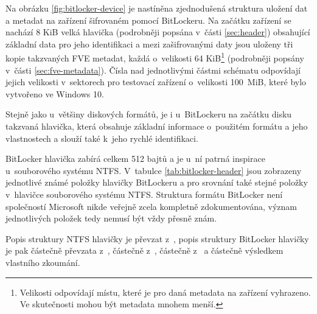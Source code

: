 Na obrázku \ref{fig:bitlocker-device} je nastíněna zjednodušená struktura uložení dat a metadat na zařízení šifrovaném pomocí BitLockeru. Na začátku zařízení se nachází 8 KiB velká hla\-vič\-ka (podrobněji popsána v~části \ref{sec:header}) obsahující základní data pro jeho identifikaci a mezi zašifrovanými daty jsou uloženy tři kopie takzvaných FVE metadat, každá o~velikosti 64 KiB\footnote{Velikosti odpovídají místu, které je pro daná metadata na zařízení vyhrazeno. Ve skutečnosti mohou být metadata mnohem menší.} (podrobněji popsány v~části \ref{sec:fve-metadata}). Čísla nad jednotlivými částmi schématu odpovídají jejich velikosti v~sektorech pro testovací zařízení o~velikosti 100~MiB, které bylo vytvořeno ve Windows 10.

\label{sec:header}

Stejně jako u~většiny diskových formátů, je i u~BitLockeru na začátku disku takzvaná hlavička, která obsahuje základní informace o~použitém formátu a jeho vlastnostech a slouží také k~jeho rychlé identifikaci.

BitLocker hlavička zabírá celkem 512 bajtů a je u~ní patrná inspirace u~souborového systému NTFS. V~tabulce \ref{tab:bitlocker-header} jsou zobrazeny jednotlivé známé položky hlavičky BitLockeru a pro srovnání také stejné položky v~hlavičce souborového systému NTFS. Struktura formátu BitLocker není společností Microsoft nikde veřejně zcela kompletně zdokumentována, význam jednotlivých položek tedy nemusí být vždy přesně znám.

Popis struktury NTFS hlavičky je převzat z~\cite{Carrier2005}, popis struktury BitLocker hlavičky je pak částečně převzata z~\cite{Metz2011}, částečně z~\cite{Ferguson2006}, částečně z~\cite{Kornblum2009} a částečně výsledkem vlastního zkoumání.

